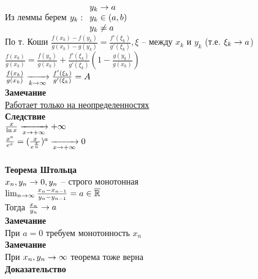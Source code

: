 \documentclass[12pt]{article}
\begin{document}
Из леммы берем $y_k: \begin{array}{l}
     y_k \rightarrow a\\
     y_k \in (a, b)\\
     y_k \neq a
\end{array}$\\
По т. Коши $\frac{f(x_k)-f(y_k)}{g(x_k)-g(y_k)} = \frac{f'(\xi_k)}{g'(\xi_k)}, \xi$ -- между $x_k$ и $y_k$ (т.е. $\xi_k \rightarrow a$)\\
$\frac{f(x_k)}{g(x_k)} = \frac{f(y_k)}{g(x_k)} + \frac{f'(\xi_k)}{g'(\xi_k)}(1-\frac{g(y_k)}{g(x_k)})$\\
$\frac{f(x_k)}{g(x_k)} \xrightarrow[k\rightarrow \infty]{} \frac{f'(\xi_k)}{g'(\xi_k)} = A$\\
\textbf{Замечание}\\
\underline{Работает только на неопределенностях}\\
\textbf{Следствие}\\
$\frac{x}{\ln x} \xrightarrow[x\rightarrow+\infty]{} +\infty$\\
$\frac{x^a}{e^x} = (\frac{x}{e^{\frac{x}{n}}})^a \xrightarrow[x\rightarrow +\infty]{} 0$\\\\
\textbf{Теорема Штольца}\\
$x_n, y_n \rightarrow 0, y_n$ -- строго монотонная\\
$\lim_{n \rightarrow \infty} \frac{x_n-x_{n-1}}{y_n-y_{n-1}} = a \in \overline{\mathbb{R}}$\\
Тогда $\frac{x_n}{y_n} \rightarrow a$\\
\textbf{Замечание}\\
При $a = 0$ требуем монотонность $x_n$\\
\textbf{Замечание}\\
При $x_n, y_n \rightarrow \infty$ теорема тоже верна\\
\textbf{Доказательство}
\end{document}
